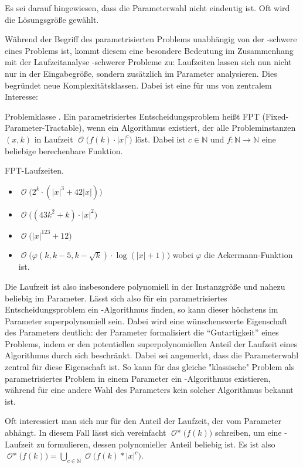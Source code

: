 \documentclass[a4paper,ngerman]{atseminar}
\newcommand{\N}{\ensuremath{\mathbb{N}}\xspace}
\newcommand{\BigO}[1]{\ensuremath{\operatorname{\mathcal{O}}\bigl(#1\bigr)}\xspace}
\newcommand{\BigOStar}[1]{\ensuremath{\operatorname{\mathcal{O*}}\bigl(#1\bigr)}\xspace}
\begin{document}
\noindent
Es sei darauf hingewiesen, dass die Parameterwahl nicht eindeutig ist. Oft wird die Lösungsgröße gewählt.

\noindent
Während der Begriff des parametrisierten Problems unabhängig von der \NP-schwere eines Problems ist, kommt diesem eine besondere
Bedeutung im Zusammenhang mit der Laufzeitanalyse \NP-schwerer Probleme zu: Laufzeiten lassen sich nun nicht nur in der Eingabegröße, sondern zusätzlich
im Parameter analysieren.
Dies begründet neue Komplexitätsklassen. Dabei ist eine für uns von zentralem Interesse:

\begin{definition}{Problemklasse \FPT.}
  Ein parametrisiertes Entscheidungsproblem heißt FPT (Fixed-Parameter-Tractable), wenn ein Algorithmus existiert,
  der alle Probleminstanzen $(x, k)$ in Laufzeit \BigO{f(k) \cdot |x|^c} löst.
  Dabei ist $c \in \N$ und $f: \N \rightarrow \N$ eine beliebige berechenbare Funktion.
\end{definition}

\begin{example}{FPT-Laufzeiten.}
  \begin{itemize}
    \item \BigO{2^k \cdot (|x|^3+42|x|)}
    \item \BigO{(43k^2+k) \cdot {|x|^2}}
    \item \BigO{|x|^{123}+12}
    \item \BigO{\varphi(k, k - 5, k - \sqrt{k}) \cdot \log(|x| + 1)} wobei $\varphi$ die Ackermann-Funktion ist.
  \end{itemize}
\end{example}

\noindent
Die Laufzeit ist also insbesondere polynomiell in der Instanzgröße und nahezu beliebig im Parameter.
Lässt sich also für ein parametrisiertes Entscheidungsproblem ein \FPT-Algorithmus finden, so kann dieser höchstens im Parameter superpolynomiell sein.
Dabei wird eine wünschenswerte Eigenschaft des Parameters deutlich: der Parameter formalisiert die \enquote{Gutartigkeit} eines Problems, indem er den potentiellen superpolynomiellen
Anteil der Laufzeit eines Algorithmus durch sich beschränkt. Dabei sei angemerkt, dass die Parameterwahl zentral für diese Eigenschaft ist.
So kann für das gleiche "klassische" Problem als parametrisiertes Problem in einem Parameter ein \FPT-Algorithmus existieren, während für eine andere Wahl
des Parameters kein solcher Algorithmus bekannt ist.

Oft interessiert man sich nur für den Anteil der Laufzeit, der vom Parameter abhängt. In diesem Fall lässt sich vereinfacht
$\BigOStar{f(k)}$ schreiben, um eine \FPT-Laufzeit zu formulieren, dessen polynomieller Anteil beliebig ist.
Es ist also $\BigOStar{f(k)} = \bigcup_{c \in \N} \BigO{f(k) * |x|^c}$.
\end{document}
